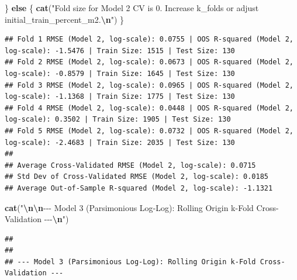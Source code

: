 \documentclass[
]{article}
\newenvironment{Shaded}{\begin{snugshade}}{\end{snugshade}}
\newcommand{\ControlFlowTok}[1]{\textcolor[rgb]{0.13,0.29,0.53}{\textbf{#1}}}
\newcommand{\FunctionTok}[1]{\textcolor[rgb]{0.13,0.29,0.53}{\textbf{#1}}}
\newcommand{\NormalTok}[1]{#1}
\newcommand{\SpecialCharTok}[1]{\textcolor[rgb]{0.81,0.36,0.00}{\textbf{#1}}}
\newcommand{\StringTok}[1]{\textcolor[rgb]{0.31,0.60,0.02}{#1}}
\begin{document}
\begin{Shaded}
\begin{Highlighting}[]
\NormalTok{  \} }\ControlFlowTok{else}\NormalTok{ \{}
    \FunctionTok{cat}\NormalTok{(}\StringTok{"Fold size for Model 2 CV is 0. Increase k\_folds or adjust initial\_train\_percent\_m2.}\SpecialCharTok{\textbackslash{}n}\StringTok{"}\NormalTok{)}
\NormalTok{  \}}
\end{Highlighting}
\end{Shaded}

\begin{verbatim}
## Fold 1 RMSE (Model 2, log-scale): 0.0755 | OOS R-squared (Model 2, log-scale): -1.5476 | Train Size: 1515 | Test Size: 130 
## Fold 2 RMSE (Model 2, log-scale): 0.0673 | OOS R-squared (Model 2, log-scale): -0.8579 | Train Size: 1645 | Test Size: 130 
## Fold 3 RMSE (Model 2, log-scale): 0.0965 | OOS R-squared (Model 2, log-scale): -1.1368 | Train Size: 1775 | Test Size: 130 
## Fold 4 RMSE (Model 2, log-scale): 0.0448 | OOS R-squared (Model 2, log-scale): 0.3502 | Train Size: 1905 | Test Size: 130 
## Fold 5 RMSE (Model 2, log-scale): 0.0732 | OOS R-squared (Model 2, log-scale): -2.4683 | Train Size: 2035 | Test Size: 130 
## 
## Average Cross-Validated RMSE (Model 2, log-scale): 0.0715 
## Std Dev of Cross-Validated RMSE (Model 2, log-scale): 0.0185 
## Average Out-of-Sample R-squared (Model 2, log-scale): -1.1321
\end{verbatim}

\begin{Shaded}
\begin{Highlighting}[]
    \FunctionTok{cat}\NormalTok{(}\StringTok{"}\SpecialCharTok{\textbackslash{}n\textbackslash{}n}\StringTok{{-}{-}{-} Model 3 (Parsimonious Log{-}Log): Rolling Origin k{-}Fold Cross{-}Validation {-}{-}{-}}\SpecialCharTok{\textbackslash{}n}\StringTok{"}\NormalTok{)}
\end{Highlighting}
\end{Shaded}

\begin{verbatim}
## 
## 
## --- Model 3 (Parsimonious Log-Log): Rolling Origin k-Fold Cross-Validation ---
\end{verbatim}
\end{document}
